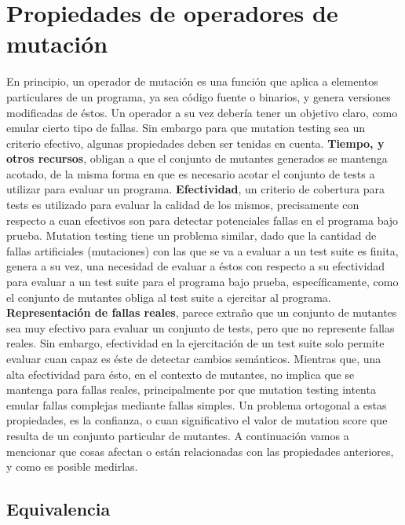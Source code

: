 \section{Propiedades de operadores de mutaci\'on}
\label{sec:preliminares.mutation.opevaluation}

En principio, un operador de mutaci\'on es una funci\'on que aplica a elementos particulares de un programa, ya sea c\'odigo fuente o binarios, y genera versiones modificadas de \'estos. Un operador a su vez deber\'ia tener un objetivo claro, como emular cierto tipo de fallas. Sin embargo para que mutation testing sea un criterio efectivo, algunas propiedades deben ser tenidas en cuenta. \textbf{Tiempo, y otros recursos}, obligan a que el conjunto de mutantes generados se mantenga acotado, de la misma forma en que es necesario acotar el conjunto de tests a utilizar para evaluar un programa. \textbf{Efectividad}, un criterio de cobertura para tests es utilizado para evaluar la calidad de los mismos, precisamente con respecto a cuan efectivos son para detectar potenciales fallas en el programa bajo prueba. Mutation testing tiene un problema similar, dado que la cantidad de fallas artificiales (mutaciones) con las que se va a evaluar a un test suite es finita, genera a su vez, una necesidad de evaluar a \'estos con respecto a su efectividad para evaluar a un test suite para el programa bajo prueba, espec\'ificamente, como el conjunto de mutantes obliga al test suite a ejercitar al programa. \textbf{Representaci\'on de fallas reales}, parece extra\~no que un conjunto de mutantes sea muy efectivo para evaluar un conjunto de tests, pero que no represente fallas reales. Sin embargo, efectividad en la ejercitaci\'on de un test suite solo permite evaluar cuan capaz es \'este de detectar cambios sem\'anticos. Mientras que, una alta efectividad para \'esto, en el contexto de mutantes, no implica que se mantenga para fallas reales, principalmente por que mutation testing intenta emular fallas complejas mediante fallas simples. Un problema ortogonal a estas propiedades, es la confianza, o cuan significativo el valor de mutation score que resulta de un conjunto particular de mutantes. A continuaci\'on vamos a mencionar que cosas afectan o est\'an relacionadas con las propiedades anteriores, y como es posible medirlas.

\subsection{Equivalencia}

